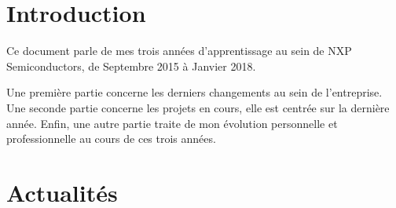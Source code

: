 \documentclass[french,12pt,a4paper,titlepage,openright,openbib]{report}
\begin{document}
\chapter{Introduction}

Ce document parle de mes trois années d'apprentissage au sein de NXP Semiconductors, de Septembre 2015 à Janvier 2018.

Une première partie concerne les derniers changements au sein de l'entreprise.
Une seconde partie concerne les projets en cours, elle est centrée sur la dernière année.
Enfin, une autre partie traite de mon évolution personnelle et professionnelle au cours de ces trois années.

\chapter{Actualités}
\end{document}

